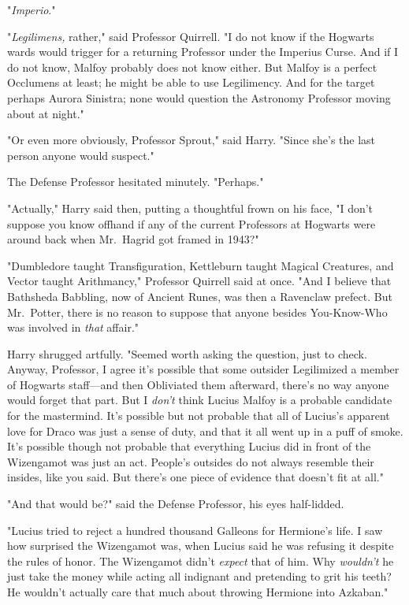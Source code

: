 "\emph{Imperio}."

"\emph{Legilimens,} rather," said Professor Quirrell. "I do not know if the
Hogwarts wards would trigger for a returning Professor under the Imperius
Curse. And if I do not know, Malfoy probably does not know either. But Malfoy
is a perfect Occlumens at least; he might be able to use Legilimency. And for
the target{\el} perhaps Aurora Sinistra; none would question the Astronomy
Professor moving about at night."

"Or even more obviously, Professor Sprout," said Harry. "Since she's the last
person anyone would suspect."

The Defense Professor hesitated minutely. "Perhaps."

"Actually," Harry said then, putting a thoughtful frown on his face, "I don't
suppose you know offhand if any of the current Professors at Hogwarts were
around back when Mr.~Hagrid got framed in 1943?"

"Dumbledore taught Transfiguration, Kettleburn taught Magical Creatures, and
Vector taught Arithmancy," Professor Quirrell said at once. "And I believe that
Bathsheda Babbling, now of Ancient Runes, was then a Ravenclaw prefect. But
Mr.~Potter, there is no reason to suppose that anyone besides You-Know-Who was
involved in \emph{that} affair."

Harry shrugged artfully. "Seemed worth asking the question, just to check.
Anyway, Professor, I agree it's possible that some outsider Legilimized a
member of Hogwarts staff---and then Obliviated them afterward, there's no way
anyone would forget that part. But I \emph{don't} think Lucius Malfoy is a
probable candidate for the mastermind. It's possible but not probable that all
of Lucius's apparent love for Draco was just a sense of duty, and that it all
went up in a puff of smoke. It's possible though not probable that everything
Lucius did in front of the Wizengamot was just an act. People's outsides do not
always resemble their insides, like you said. But there's one piece of evidence
that doesn't fit at all."

"And that would be?" said the Defense Professor, his eyes half-lidded.

"Lucius tried to reject a hundred thousand Galleons for Hermione's life. I saw
how surprised the Wizengamot was, when Lucius said he was refusing it despite
the rules of honor. The Wizengamot didn't \emph{expect} that of him. Why
\emph{wouldn't} he just take the money while acting all indignant and
pretending to grit his teeth? He wouldn't actually care that much about
throwing Hermione into Azkaban."

